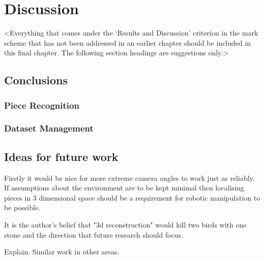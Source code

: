 \chapter{Discussion}
\label{conclusions}

<Everything that comes under the `Results and Discussion' criterion in the mark scheme that has not been addressed in an earlier chapter should be included in this final chapter. The following section headings are suggestions only.>

\section{Conclusions}

\subsection{Piece Recognition}

\subsection{Dataset Management}

\section{Ideas for future work}
Firstly it would be nice for more extreme camera angles to work just as reliably.  If assumptions about the environment are to be kept minimal
then localising pieces in 3 dimensional space should be a requirement for robotic manipulation to be possible.

It is the author's belief that "3d reconstruction" would kill two birds with one stone and the direction that future research should focus.

Explain.  Similar work in other areas.